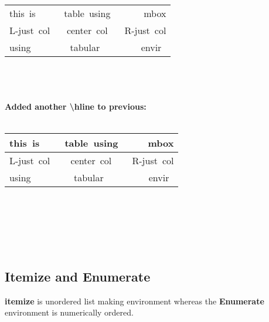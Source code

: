 {{        \begin{tabular}{l | c | r}
        \hline
        \mbox{this is}&\mbox{ table using}&\mbox{ mbox} \\
        \mbox{L-just col}&\mbox{ center col}&\mbox{ R-just col}\\
        \mbox{using }&\mbox{ tabular }&\mbox{ envir } \\
        \end{tabular}\\ 
        \mbox{}\\
        \mbox{}\\

        \textbf{Added another \textbackslash{hline} to previous:} \\
        \mbox{}\\

        \begin{tabular}{l | c | r}
        \hline
        \mbox{this is}&\mbox{ table using}&\mbox{ mbox} \\ \hline
        \mbox{L-just col}&\mbox{ center col}&\mbox{ R-just col}\\
        \mbox{using }&\mbox{ tabular }&\mbox{ envir } \\
        \end{tabular}\\  
        \mbox{}\\
        \mbox{}\\
    } 
}\\



\subsection{Itemize and Enumerate}
\textbf{itemize} is unordered list making environment whereas
the \textbf{Enumerate} environment is numerically ordered.\\
\\


